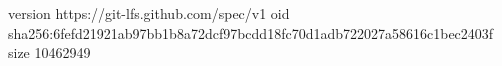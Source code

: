 version https://git-lfs.github.com/spec/v1
oid sha256:6fefd21921ab97bb1b8a72dcf97bcdd18fc70d1adb722027a58616c1bec2403f
size 10462949
